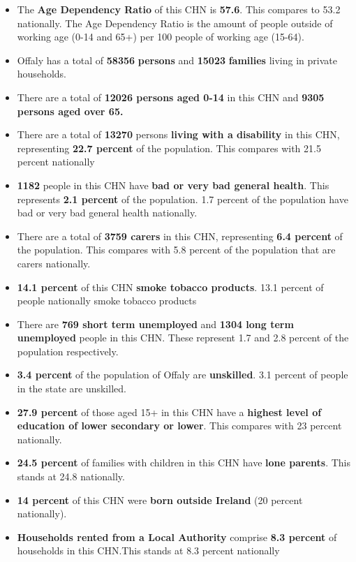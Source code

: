 \documentclass{article}
\begin{document}
\begin{itemize}

\item The \textbf{Age Dependency Ratio} of this CHN is  \textbf{57.6}. This compares to 53.2 nationally. The Age Dependency Ratio is the amount of people outside of working age (0-14 and 65+) per 100 people of working age (15-64). 

\item Offaly has a total of \textbf{\num{58356}} \textbf{persons} and  \textbf{\num{15023}} \textbf{families} living in private households.

\item There are a total of \textbf{\num{12026} persons aged 0-14} in this CHN and \textbf{\num{9305} persons aged over 65.} 

\item There are a total of \textbf{\num{13270}} persons \textbf{living with a disability} in this CHN, representing \textbf{22.7 percent} of the population. This compares with  21.5 percent nationally

\item \textbf{\num{1182}} people in this CHN have \textbf{bad or very bad general health}. This represents \textbf{2.1 percent} of the population. 1.7 percent of the population have bad or very bad general health nationally. 

\item There are a total of \textbf{\num{3759} carers} in this CHN, representing \textbf{6.4 percent} of the population. This compares with 5.8 percent of the population that are carers nationally. 

\item \textbf{14.1 percent} of this CHN \textbf{smoke tobacco products}. 13.1 percent of people nationally smoke tobacco products

\item There are \textbf{\num{769} short term unemployed} and \textbf{\num{1304} long term unemployed} people in this CHN. These represent 1.7 and 2.8 percent of the population respectively.

\item  \textbf{3.4 percent} of the population of Offaly are \textbf{unskilled}. 3.1 percent of people in the state are unskilled.

\item \textbf{27.9 percent} of those aged 15+ in this CHN have a \textbf{highest level of education of lower secondary or lower}. This compares with 23 percent nationally. 

\item \textbf{24.5 percent} of families with children in this CHN have \textbf{lone parents}. This stands at 24.8 nationally.

\item \textbf{14 percent} of this CHN were \textbf{born outside Ireland} (20 percent nationally).

\item \textbf{Households rented from a Local Authority} comprise \textbf{8.3 percent} of households in this CHN.This stands at 8.3 percent nationally

\end{itemize}
\end{document}
